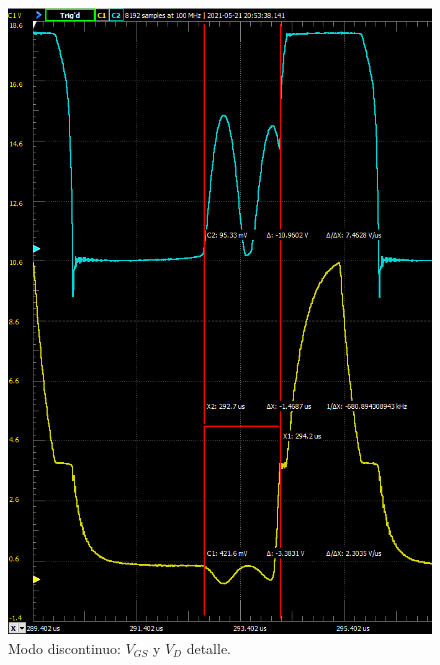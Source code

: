 \begin{figure}[H]
	\centering
	\includegraphics[width=\linewidth]{Imagenes/Discontinuo_VGS_VDiodo_2}
	\caption{Modo discontinuo: $V_{GS}$ y $V_D$ detalle.}
	\label{fig:DISC_VGS_VD_2}
\end{figure}
